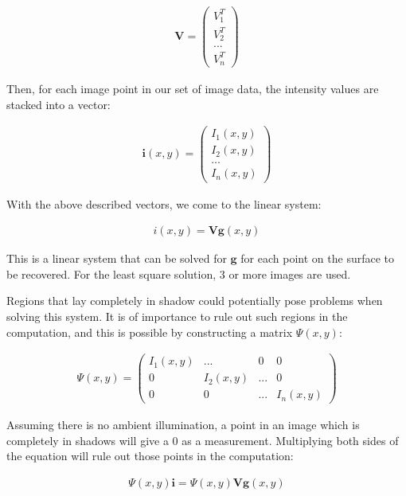 	\begin{eqnarray*}
		\textbf{V} = \begin{pmatrix} V_1^T \\ V_2^T \\ ... \\ V_n^T \end{pmatrix}
	\end{eqnarray*}

\noindent Then, for each image point in our set of image data, the intensity values are stacked into a vector:

	\begin{eqnarray*}
		\textbf{i}(x,y) = \begin{pmatrix} I_1(x,y) \\ I_2(x,y) \\ ... \\ I_n(x,y) \end{pmatrix}
	\end{eqnarray*}

\noindent With the above described vectors, we come to the linear system:

	\begin{eqnarray*}
		i(x,y) = \textbf{V}\textbf{g}(x,y)
	\end{eqnarray*}

\noindent This is a linear system that can be solved for $\textbf{g}$ for each point on the surface to be recovered. For the least square solution, 3 or more images are used.

Regions that lay completely in shadow could potentially pose problems when solving this system. It is of importance to rule out such regions in the computation, and this is possible by constructing a matrix $\Psi(x,y)$:

	\begin{eqnarray*}
		\Psi(x,y) = \begin{pmatrix} I_1(x,y) & ... & 0 & 0\\ 
									0 & I_2(x,y) & ... & 0\\ 
									0 & 0 & ... & I_n(x,y) \end{pmatrix}
	\end{eqnarray*}

\noindent Assuming there is no ambient illumination, a point in an image which is completely in shadows will give a 0 as a measurement. Multiplying both sides of the equation will rule out those points in the computation:

	\begin{eqnarray*}
		\Psi(x,y)\textbf{i} = \Psi(x,y)\textbf{V}\textbf{g}(x,y)
	\end{eqnarray*}

